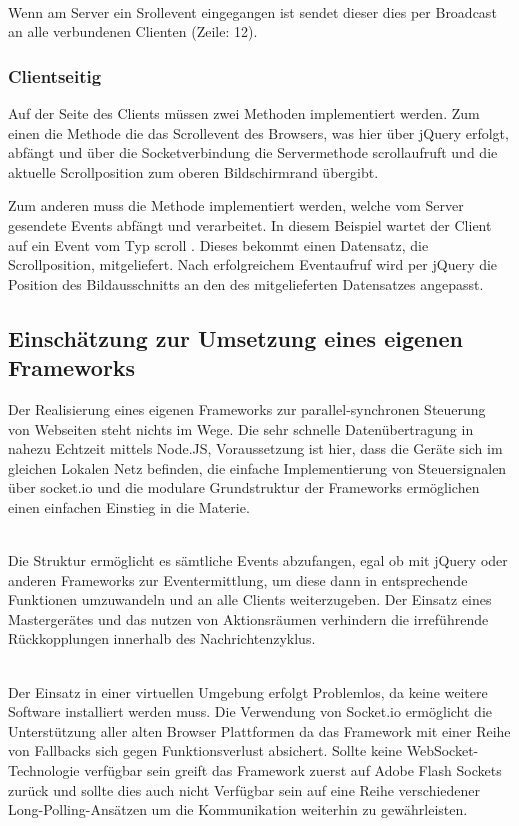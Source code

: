 	\\Wenn am Server ein Srollevent eingegangen ist sendet dieser dies per Broadcast an alle verbundenen Clienten (Zeile: 12).
	
	\subsubsection{Clientseitig}
	Auf der Seite des Clients müssen zwei Methoden implementiert werden. Zum einen die Methode die das Scrollevent des Browsers, was hier über jQuery erfolgt, abfängt und über die Socketverbindung die Servermethode \frqq scroll\flqq  aufruft und die aktuelle Scrollposition zum oberen Bildschirmrand übergibt.
	
	
	Zum anderen muss die Methode implementiert werden, welche vom Server gesendete Events abfängt und verarbeitet. In diesem Beispiel wartet der Client auf ein Event vom Typ \frqq scroll \flqq. Dieses bekommt einen Datensatz, die Scrollposition, mitgeliefert. Nach erfolgreichem Eventaufruf wird per jQuery die Position des Bildausschnitts an den des mitgelieferten Datensatzes angepasst.
	

	\subsection{Einschätzung zur Umsetzung eines eigenen Frameworks}
	Der Realisierung eines eigenen Frameworks zur parallel-synchronen Steuerung von Webseiten steht nichts im Wege. Die sehr schnelle Datenübertragung in nahezu Echtzeit mittels Node.JS, Voraussetzung ist hier, dass die Geräte sich im gleichen Lokalen Netz befinden, die einfache Implementierung von Steuersignalen über socket.io und die modulare Grundstruktur der Frameworks ermöglichen einen einfachen Einstieg in die Materie.

\\Die Struktur ermöglicht es sämtliche Events abzufangen, egal ob mit jQuery oder anderen Frameworks zur Eventermittlung, um diese dann in entsprechende Funktionen umzuwandeln und an alle Clients weiterzugeben. Der Einsatz eines Mastergerätes und das nutzen von Aktionsräumen verhindern die irreführende Rückkopplungen innerhalb des Nachrichtenzyklus. 

\\Der Einsatz in einer virtuellen Umgebung erfolgt Problemlos, da keine weitere Software installiert werden muss. Die Verwendung von Socket.io ermöglicht die Unterstützung aller alten Browser Plattformen da das Framework mit einer Reihe von Fallbacks sich gegen Funktionsverlust absichert. Sollte keine WebSocket-Technologie verfügbar sein greift das Framework zuerst auf Adobe Flash Sockets zurück und sollte dies auch nicht Verfügbar sein auf eine Reihe verschiedener Long-Polling-Ansätzen um die Kommunikation weiterhin zu gewährleisten.